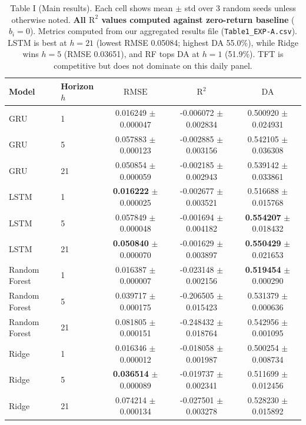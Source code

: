 \documentclass[conference,a4paper]{IEEEtran}
\newcommand{\rmse}{\ensuremath{\mathrm{RMSE}}}
\newcommand{\rTwo}{\ensuremath{\mathrm{R}^2}}
\newcommand{\da}{\ensuremath{\mathrm{DA}}}
\begin{document}
\begin{table}[t]
    \centering
    \caption{Table I (Main results). Each cell shows mean $\pm$ std over 3 random seeds unless otherwise noted. \textbf{All \rTwo{} values computed against zero-return baseline} ($b_i = 0$). Metrics computed from our aggregated results file (\texttt{Table1\_EXP-A.csv}). LSTM is best at $h{=}21$ (lowest RMSE 0.05084; highest DA 55.0\%), while Ridge wins $h{=}5$ (RMSE 0.03651), and RF tops DA at $h{=}1$ (51.9\%). TFT is competitive but does not dominate on this daily panel.}
    \label{tab:main_results}
    \begin{tabular}{llccc}
        \toprule
        Model & Horizon $h$ & $\rmse$ & $\rTwo$ & $\da$ \\
        \midrule
        GRU            & 1  & 0.016249 $\pm$ 0.000047 & -0.006072 $\pm$ 0.002834 & 0.500920 $\pm$ 0.024931 \\
        GRU            & 5  & 0.057883 $\pm$ 0.000123 & -0.002885 $\pm$ 0.003156 & 0.542105 $\pm$ 0.036308 \\
        GRU            & 21 & 0.050854 $\pm$ 0.000059 & -0.002185 $\pm$ 0.002943 & 0.539142 $\pm$ 0.033861 \\
        LSTM           & 1  & \textbf{0.016222} $\pm$ 0.000025 & -0.002677 $\pm$ 0.003521 & 0.516688 $\pm$ 0.015768 \\
    LSTM           & 5  & 0.057849 $\pm$ 0.000048 & -0.001694 $\pm$ 0.004182 & \textbf{0.554207} $\pm$ 0.018432 \\
    LSTM           & 21 & \textbf{0.050840} $\pm$ 0.000070 & -0.001629 $\pm$ 0.003897 & \textbf{0.550429} $\pm$ 0.021653 \\
        Random Forest  & 1  & 0.016387 $\pm$ 0.000007 & -0.023148 $\pm$ 0.002156 & \textbf{0.519454} $\pm$ 0.000290 \\
        Random Forest  & 5  & 0.039717 $\pm$ 0.000175 & -0.206505 $\pm$ 0.015423 & 0.531379 $\pm$ 0.000636 \\
        Random Forest  & 21 & 0.081805 $\pm$ 0.000151 & -0.248432 $\pm$ 0.018764 & 0.542956 $\pm$ 0.001095 \\
    Ridge          & 1  & 0.016346 $\pm$ 0.000012 & -0.018058 $\pm$ 0.001987 & 0.500254 $\pm$ 0.008734 \\
    Ridge          & 5  & \textbf{0.036514} $\pm$ 0.000089 & -0.019737 $\pm$ 0.002341 & 0.511699 $\pm$ 0.012456 \\
    Ridge          & 21 & 0.074214 $\pm$ 0.000134 & -0.027501 $\pm$ 0.003278 & 0.528230 $\pm$ 0.015892 \\

\end{tabular}
\end{table}
\end{document}

